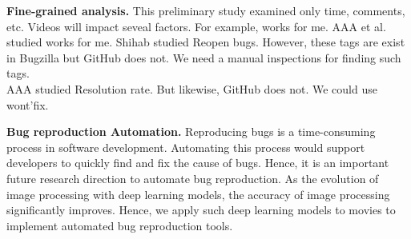 \noindent
\textbf{Fine-grained analysis. }
This preliminary study examined only time, comments, etc. Videos will impact seveal factors. For example, works for me. AAA et al. studied works for me. Shihab studied Reopen bugs. However, these tags are exist in Bugzilla  but GitHub does not. We need a manual inspections for finding such tags. 
\\
AAA studied Resolution rate. But likewise, GitHub does not. We could use wont'fix. 


\noindent
\textbf{Bug reproduction Automation.}
Reproducing bugs is a time-consuming process 
in software development.
Automating this process would support developers 
to quickly find and fix the cause of bugs. 
Hence, it is an important future research direction 
to automate bug reproduction. 
As the evolution of image processing with deep learning models, 
the accuracy of image processing significantly improves. 
Hence, we apply such deep learning models to movies 
to implement automated bug reproduction tools. 





%  

